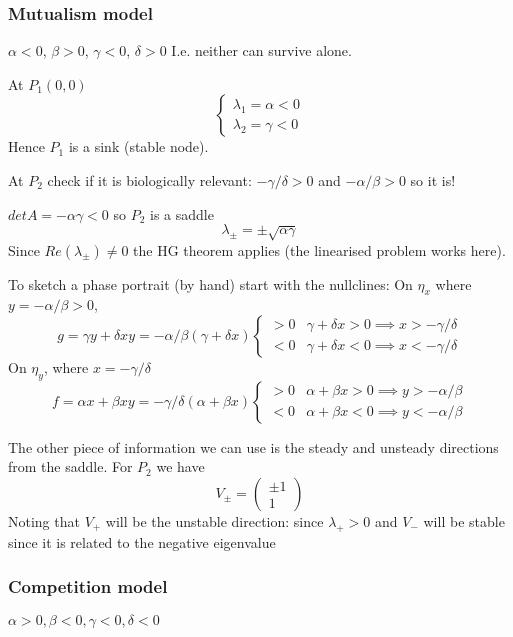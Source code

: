 \documentclass{X:/Documents/Coding/Latex/myassignment}
\begin{document}
\subsubsection{Mutualism model}
$\alpha <0$, $\beta>0$, $\gamma <0$, $\delta>0$
I.e. neither can survive alone.

At $P_1(0,0) $
\[\begin{cases}
    \lambda_1 = \alpha < 0\\
    \lambda_2 = \gamma <0
\end{cases}\]
Hence $P_1$ is a sink (stable node).


At $P_2$ check if it is biologically relevant: $-\gamma/\delta >0$ and $-\alpha/\beta > 0$ so it is!

$detA = -\alpha \gamma <0$ so $P_2$ is a saddle
\[\lambda_\pm = \pm \sqrt{\alpha \gamma}\]
Since $Re(\lambda_\pm) \neq 0$ the HG theorem applies (the linearised problem works here).


To sketch a phase portrait (by hand) start with the nullclines:
On $\eta_x$ where $y = -\alpha/\beta > 0$, 
\[g = \gamma y + \delta xy = -\alpha/\beta(\gamma + \delta x) \begin{cases}
    > 0 & \gamma+\delta x > 0 \implies x > -\gamma/\delta\\
    < 0 & \gamma+\delta x < 0 \implies x < - \gamma/\delta
\end{cases}\]
On $\eta_y$, where $x = -\gamma/\delta$
\[f = \alpha x + \beta xy = -\gamma/\delta(\alpha + \beta x) \begin{cases}
    > 0 & \alpha+\beta x > 0 \implies y > -\alpha/\beta\\
    < 0 & \alpha+\beta x < 0 \implies y < - \alpha/\beta
\end{cases}\]

The other piece of information we can use is the steady and unsteady directions from the saddle.
For $P_2$ we have
\[V_\pm = \begin{pmatrix}
    \pm 1\\1
\end{pmatrix}\]
Noting that $V_+$ will be the unstable direction: since $\lambda_+ > 0$ and $V_-$ will be stable since it is related to the negative eigenvalue



\subsubsection{Competition model}
$\alpha>0, \beta<0, \gamma<0, \delta<0$
\end{document}
